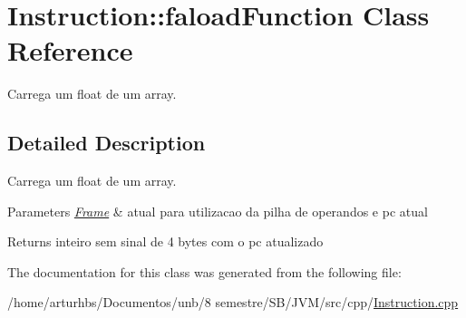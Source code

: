 \hypertarget{classInstruction_1_1faloadFunction}{}\section{Instruction\+:\+:faload\+Function Class Reference}
\label{classInstruction_1_1faloadFunction}


Carrega um float de um array.  




\subsection{Detailed Description}
Carrega um float de um array. 


\begin{DoxyParams}{Parameters}
{\em \hyperlink{classFrame}{Frame}} & atual para utilizacao da pilha de operandos e pc atual \\
\hline
\end{DoxyParams}
\begin{DoxyReturn}{Returns}
inteiro sem sinal de 4 bytes com o pc atualizado 
\end{DoxyReturn}


The documentation for this class was generated from the following file\+:\begin{DoxyCompactItemize}
\item 
/home/arturhbs/\+Documentos/unb/8 semestre/\+S\+B/\+J\+V\+M/src/cpp/\hyperlink{Instruction_8cpp}{Instruction.\+cpp}\end{DoxyCompactItemize}
